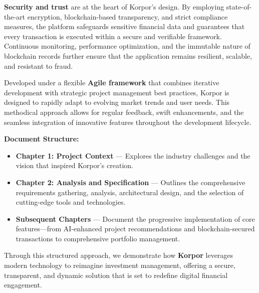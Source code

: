 \vspace{0.3cm}

\noindent \textbf{\textcolor{primary}{Security and trust}} are at the heart of Korpor's design. By employing state-of-the-art encryption, blockchain-based transparency, and strict compliance measures, the platform safeguards sensitive financial data and guarantees that every transaction is executed within a secure and verifiable framework. Continuous monitoring, performance optimization, and the immutable nature of blockchain records further ensure that the application remains resilient, scalable, and resistant to fraud.

\vspace{0.3cm}

\noindent Developed under a flexible \textbf{Agile framework} that combines iterative development with strategic project management best practices, Korpor is designed to rapidly adapt to evolving market trends and user needs. This methodical approach allows for regular feedback, swift enhancements, and the seamless integration of innovative features throughout the development lifecycle.

\vspace{0.3cm}

\noindent \textbf{\textcolor{primary}{Document Structure:}}

\vspace{0.2cm}

\begin{itemize}[leftmargin=1.8em, itemsep=0.25em, parsep=0pt, topsep=0.1cm]
    \item \textbf{Chapter 1: \textcolor{primary}{Project Context}} — Explores the industry challenges and the vision that inspired Korpor's creation.
    
    \item \textbf{Chapter 2: \textcolor{primary}{Analysis and Specification}} — Outlines the comprehensive requirements gathering, analysis, architectural design, and the selection of cutting-edge tools and technologies.
    
    \item \textbf{Subsequent Chapters} — Document the progressive implementation of core features—from AI-enhanced project recommendations and blockchain-secured transactions to comprehensive portfolio management.
\end{itemize}

\vspace{0.2cm}

\noindent Through this structured approach, we demonstrate how \textbf{\textcolor{primary}{Korpor}} leverages modern technology to reimagine investment management, offering a secure, transparent, and dynamic solution that is set to redefine digital financial engagement.

\endgroup

\enlargethispage{2cm}
